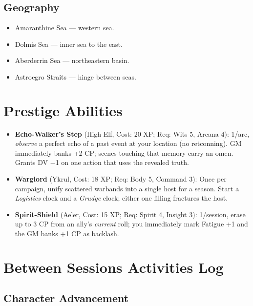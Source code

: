 \subsection{Geography}
\begin{itemize}
\item Amaranthine Sea --- western sea.
\item Dolmis Sea --- inner sea to the east.
\item Aberderrin Sea --- northeastern basin.
\item Astroegro Straits --- hinge between seas.
\end{itemize}

\section{Prestige Abilities}
\begin{itemize}
    \item \textbf{Echo-Walker's Step} (High Elf, Cost: 20 XP; Req: Wits 5, Arcana 4): 
1/arc, \emph{observe} a perfect echo of a past event at your location (no retconning). 
GM immediately banks +2 CP; scenes touching that memory carry an omen. Grants DV −1 on one action that uses the revealed truth.
    \item \textbf{Warglord} (Ykrul, Cost: 18 XP; Req: Body 5, Command 3): 
Once per campaign, unify scattered warbands into a single host for a season. Start a \emph{Logistics} clock and a \emph{Grudge} clock; either one filling fractures the host.
    \item \textbf{Spirit-Shield} (Aeler, Cost: 15 XP; Req: Spirit 4, Insight 3): 
1/session, erase up to 3 CP from an ally's \emph{current} roll; you immediately mark Fatigue +1 and the GM banks +1 CP as backlash.
\end{itemize}

\section{Between Sessions Activities Log}

\subsection{Character Advancement}

